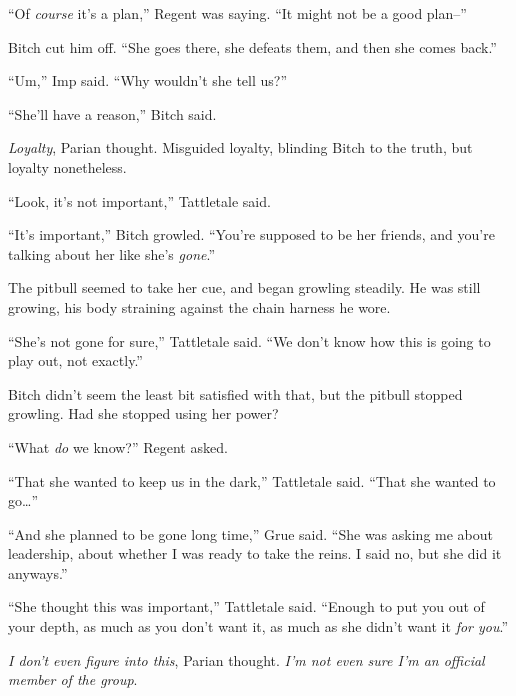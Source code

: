 ``Of \emph{course} it's a plan,'' Regent was saying.  ``It might not be a good plan--''



Bitch cut him off.  ``She goes there, she defeats them, and then she comes back.''



``Um,'' Imp said.  ``Why wouldn't she tell us?''



``She'll have a reason,'' Bitch said.



\emph{Loyalty}, Parian thought.  Misguided loyalty, blinding Bitch to the truth, but loyalty nonetheless.



``Look, it's not important,'' Tattletale said.



``It's important,'' Bitch growled.  ``You're supposed to be her friends, and you're talking about her like she's \emph{gone}.''



The pitbull seemed to take her cue, and began growling steadily.  He was still growing, his body straining against the chain harness he wore.



``She's not gone for sure,'' Tattletale said.  ``We don't know how this is going to play out, not exactly.''



Bitch didn't seem the least bit satisfied with that, but the pitbull stopped growling.  Had she stopped using her power?



``What \emph{do} we know?'' Regent asked.



``That she wanted to keep us in the dark,'' Tattletale said.  ``That she wanted to go\ldots''



``And she planned to be gone long time,'' Grue said.  ``She was asking me about leadership, about whether I was ready to take the reins.  I said no, but she did it anyways.''



``She thought this was important,'' Tattletale said.  ``Enough to put you out of your depth, as much as you don't want it, as much as she didn't want it \emph{for you}.''



\emph{I don't even figure into this}, Parian thought.  \emph{I'm not even sure I'm an official member of the group}.



